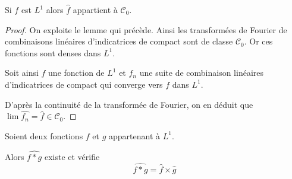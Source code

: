 %
%
%
%

\begin{theo}
Si $f$ est $L^1$ alors $\widehat{f}$ appartient à $\mathcal{C}_0$.
\end{theo}

\begin{proof}
On exploite le lemme qui précède. Ainsi les transformées de Fourier de combinaisons linéaires d'indicatrices de compact sont de classe $\mathcal{C}_0$. Or ces fonctions sont denses dans $L^1$.

Soit ainsi $f$ une fonction de $L^1$ et $f_n$ une suite de combinaison linéaires d'indicatrices de compact qui converge vers $f$ dans $L^1$.

D'après la continuité de la transformée de Fourier, on  en déduit que $\lim \widehat{f_n} = \widehat{f} \in \mathcal{C}_0$.
\end{proof}


\begin{prop}
Soient deux fonctions $f$ et $g$ appartenant à $L^1$.

Alors $\widehat{f*g}$ existe et vérifie
\[
\widehat{f*g} = \widehat{f} \times \widehat{g}
\]
\end{prop}


